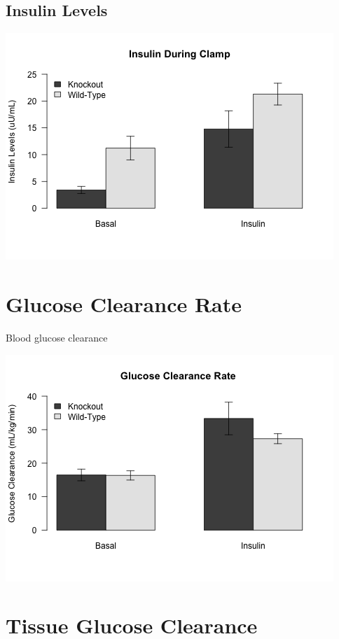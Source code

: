 \documentclass[]{article}
\begin{document}
\subsection{Insulin Levels}\label{insulin-levels}

\includegraphics{figures/insulin-1.png}

\section{Glucose Clearance Rate}\label{glucose-clearance-rate}

Blood glucose clearance

\includegraphics{figures/glucose-clearance-1.png}

\section{Tissue Glucose Clearance}\label{tissue-glucose-clearance}
\end{document}
